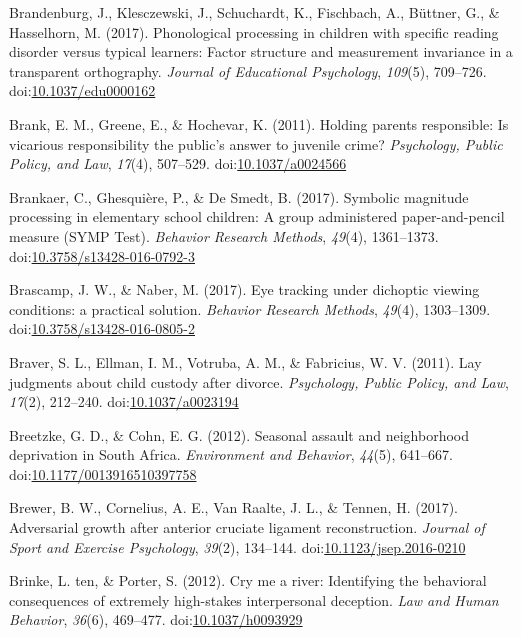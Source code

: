 \documentclass[english,man]{apa6}
\theoremstyle{definition}
\theoremstyle{definition}
\theoremstyle{definition}
\theoremstyle{remark}
\begin{document}
\hypertarget{ref-Brandenburg2017}{}
Brandenburg, J., Klesczewski, J., Schuchardt, K., Fischbach, A.,
Büttner, G., \& Hasselhorn, M. (2017). Phonological processing in
children with specific reading disorder versus typical learners: Factor
structure and measurement invariance in a transparent orthography.
\emph{Journal of Educational Psychology}, \emph{109}(5), 709--726.
doi:\href{https://doi.org/10.1037/edu0000162}{10.1037/edu0000162}

\hypertarget{ref-Brank2011}{}
Brank, E. M., Greene, E., \& Hochevar, K. (2011). Holding parents
responsible: Is vicarious responsibility the public's answer to juvenile
crime? \emph{Psychology, Public Policy, and Law}, \emph{17}(4),
507--529. doi:\href{https://doi.org/10.1037/a0024566}{10.1037/a0024566}

\hypertarget{ref-Brankaer2016}{}
Brankaer, C., Ghesquière, P., \& De Smedt, B. (2017). Symbolic magnitude
processing in elementary school children: A group administered
paper-and-pencil measure (SYMP Test). \emph{Behavior Research Methods},
\emph{49}(4), 1361--1373.
doi:\href{https://doi.org/10.3758/s13428-016-0792-3}{10.3758/s13428-016-0792-3}

\hypertarget{ref-Brascamp2017a}{}
Brascamp, J. W., \& Naber, M. (2017). Eye tracking under dichoptic
viewing conditions: a practical solution. \emph{Behavior Research
Methods}, \emph{49}(4), 1303--1309.
doi:\href{https://doi.org/10.3758/s13428-016-0805-2}{10.3758/s13428-016-0805-2}

\hypertarget{ref-Braver2011}{}
Braver, S. L., Ellman, I. M., Votruba, A. M., \& Fabricius, W. V.
(2011). Lay judgments about child custody after divorce.
\emph{Psychology, Public Policy, and Law}, \emph{17}(2), 212--240.
doi:\href{https://doi.org/10.1037/a0023194}{10.1037/a0023194}

\hypertarget{ref-Breetzke2012}{}
Breetzke, G. D., \& Cohn, E. G. (2012). Seasonal assault and
neighborhood deprivation in South Africa. \emph{Environment and
Behavior}, \emph{44}(5), 641--667.
doi:\href{https://doi.org/10.1177/0013916510397758}{10.1177/0013916510397758}

\hypertarget{ref-Brewer2017}{}
Brewer, B. W., Cornelius, A. E., Van Raalte, J. L., \& Tennen, H.
(2017). Adversarial growth after anterior cruciate ligament
reconstruction. \emph{Journal of Sport and Exercise Psychology},
\emph{39}(2), 134--144.
doi:\href{https://doi.org/10.1123/jsep.2016-0210}{10.1123/jsep.2016-0210}

\hypertarget{ref-TenBrinke2012}{}
Brinke, L. ten, \& Porter, S. (2012). Cry me a river: Identifying the
behavioral consequences of extremely high-stakes interpersonal
deception. \emph{Law and Human Behavior}, \emph{36}(6), 469--477.
doi:\href{https://doi.org/10.1037/h0093929}{10.1037/h0093929}
\end{document}
